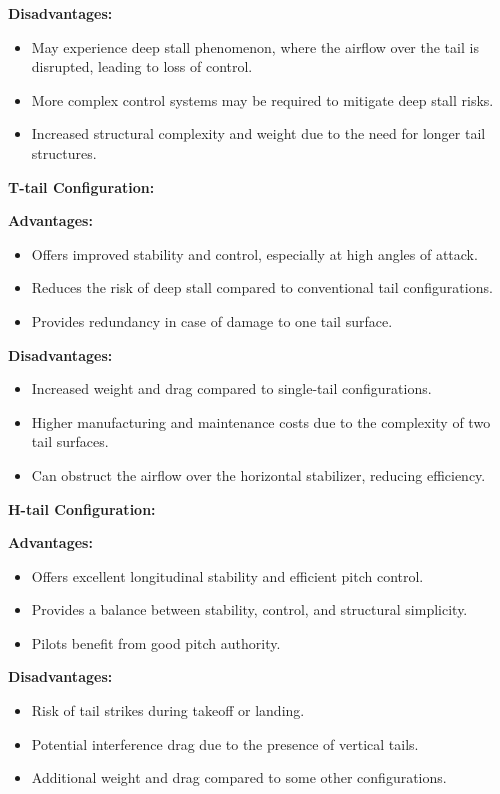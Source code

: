 \documentclass[12 pt]{article}
\begin{document}
{{\textbf{{Disadvantages:}}
\begin{itemize}
  \item May experience deep stall phenomenon, where the airflow over the tail is disrupted, leading to loss of control.
  \item More complex control systems may be required to mitigate deep stall risks.
  \item Increased structural complexity and weight due to the need for longer tail structures.
\end{itemize}
}

{\textbf{T-tail Configuration:}}

{\color{black}
\textbf{{Advantages:}}
\begin{itemize}
  \item Offers improved stability and control, especially at high angles of attack.
  \item Reduces the risk of deep stall compared to conventional tail configurations.
  \item Provides redundancy in case of damage to one tail surface.
\end{itemize}

\textbf{{Disadvantages:}}
\begin{itemize}
  \item Increased weight and drag compared to single-tail configurations.
  \item Higher manufacturing and maintenance costs due to the complexity of two tail surfaces.
  \item Can obstruct the airflow over the horizontal stabilizer, reducing efficiency.
\end{itemize}
}

{\textbf{H-tail Configuration:}}

{\color{black}
\textbf{{Advantages:}}
\begin{itemize}
  \item Offers excellent longitudinal stability and efficient pitch control.
  \item Provides a balance between stability, control, and structural simplicity.
  \item Pilots benefit from good pitch authority.
\end{itemize}

\textbf{{Disadvantages:}}
\begin{itemize}
  \item Risk of tail strikes during takeoff or landing.
  \item Potential interference drag due to the presence of vertical tails.
  \item Additional weight and drag compared to some other configurations.
\end{itemize}
}

}
\end{document}
